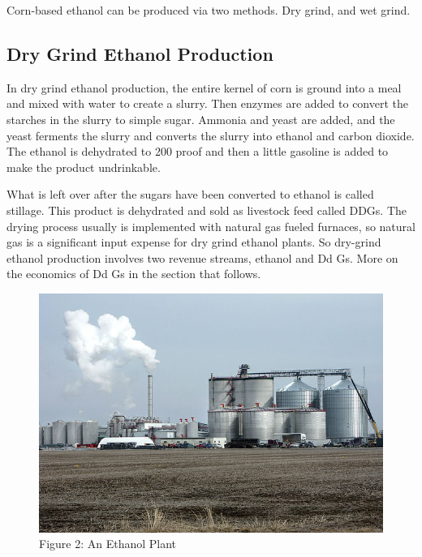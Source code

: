 \documentclass[
  letterpaper,
  DIV=11,
  numbers=noendperiod]{scrreprt}
\begin{document}
Corn-based ethanol can be produced via two methods. Dry grind, and wet
grind.

\hypertarget{dry-grind-ethanol-production}{%
\subsection{Dry Grind Ethanol
Production}\label{dry-grind-ethanol-production}}

In dry grind ethanol production, the entire kernel of corn is ground
into a meal and mixed with water to create a slurry. Then enzymes are
added to convert the starches in the slurry to simple sugar. Ammonia and
yeast are added, and the yeast ferments the slurry and converts the
slurry into ethanol and carbon dioxide. The ethanol is dehydrated to 200
proof and then a little gasoline is added to make the product
undrinkable.

What is left over after the sugars have been converted to ethanol is
called stillage. This product is dehydrated and sold as livestock feed
called DDGs. The drying process usually is implemented with natural gas
fueled furnaces, so natural gas is a significant input expense for dry
grind ethanol plants. So dry-grind ethanol production involves two
revenue streams, ethanol and Dd Gs. More on the economics of Dd Gs in
the section that follows.

\begin{figure}

{\centering \includegraphics{images/640px-Ethanol_plant.jpg}

}

\caption{Figure 2: An Ethanol Plant}

\end{figure}
\end{document}

